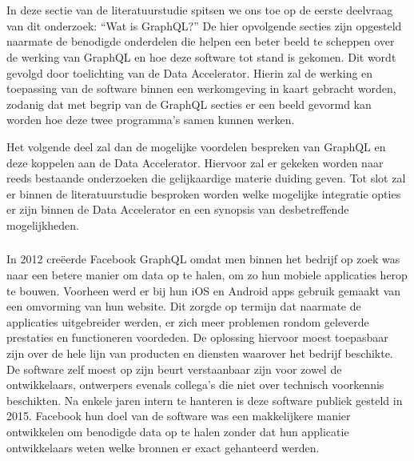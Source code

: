 \chapter{}%
\label{ch:stand-van-zaken}

\section{}%
\label{sec:GraphQL}

In deze sectie van de literatuurstudie spitsen we ons toe op de eerste deelvraag van dit onderzoek: “Wat is GraphQL?”
De hier opvolgende secties zijn opgesteld naarmate de benodigde onderdelen die helpen een beter beeld te scheppen over de werking van GraphQL en hoe deze software tot stand is gekomen.
Dit wordt gevolgd door toelichting van de Data Accelerator. Hierin zal de werking en toepassing van de software binnen een werkomgeving in kaart gebracht worden, zodanig dat met begrip van de GraphQL secties er een beeld gevormd kan worden hoe deze twee programma's samen kunnen werken.

Het volgende deel zal dan de mogelijke voordelen bespreken van GraphQL en deze koppelen aan de Data Accelerator. Hiervoor zal er gekeken worden naar reeds bestaande onderzoeken die gelijkaardige materie duiding geven.
Tot slot zal er binnen de literatuurstudie besproken worden welke mogelijke integratie opties er zijn binnen de Data Accelerator en een synopsis van desbetreffende mogelijkheden.

\subsection{}%
\label{sec:Gegevens ophalen}
In 2012 creëerde Facebook GraphQL omdat men binnen het bedrijf op zoek was naar een betere manier om data op te halen, om zo hun mobiele applicaties herop te bouwen. Voorheen werd er bij hun iOS en Android apps gebruik gemaakt van een omvorming van hun website. Dit zorgde op termijn dat naarmate de applicaties uitgebreider werden, er zich meer problemen rondom geleverde prestaties en functioneren voordeden. De oplossing hiervoor moest toepasbaar zijn over de hele lijn van producten en diensten waarover het bedrijf beschikte. De software zelf moest op zijn beurt verstaanbaar zijn voor zowel de ontwikkelaars, ontwerpers evenals collega’s die niet over technisch voorkennis beschikten. Na enkele jaren intern te hanteren is deze software publiek gesteld in 2015. Facebook hun doel van de software was een makkelijkere manier ontwikkelen om benodigde data op te halen zonder dat hun applicatie ontwikkelaars weten welke bronnen er exact gehanteerd werden.\autocite{GraphQLFoundation2022}

